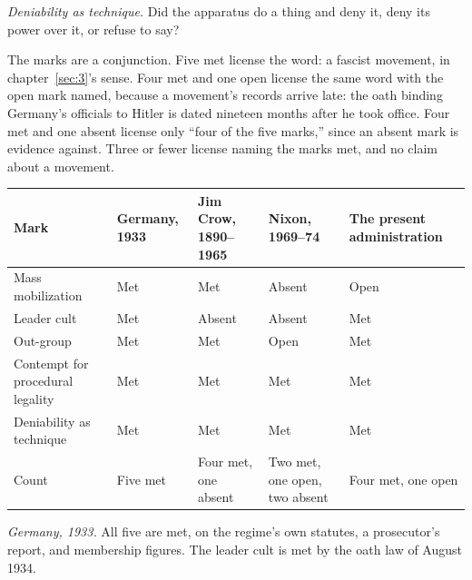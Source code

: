 \emph{Deniability as technique.} Did the apparatus do a thing and deny it, deny its power over it, or refuse to say?


The marks are a conjunction. Five met license the word: a fascist movement, in chapter~\ref{sec:3}'s sense. Four met and one open license the same word with the open mark named, because a movement's records arrive late: the oath binding Germany's officials to Hitler is dated nineteen months after he took office. Four met and one absent license only “four of the five marks,” since an absent mark is evidence against. Three or fewer license naming the marks met, and no claim about a movement.



\begingroup\small\renewcommand{\arraystretch}{1.12}
\begin{longtable}{@{}>{\raggedright\arraybackslash}p{}>{\raggedright\arraybackslash}p{}>{\raggedright\arraybackslash}p{}>{\raggedright\arraybackslash}p{}>{\raggedright\arraybackslash}p{}@{}}
\hline
\textbf{Mark} & \textbf{Germany, 1933} & \textbf{Jim Crow, 1890–1965} & \textbf{Nixon, 1969–74} & \textbf{The present administration} \\
\hline
\endhead
Mass mobilization & Met & Met & Absent & Open \\ \hline
Leader cult & Met & Absent & Absent & Met \\ \hline
Out-group & Met & Met & Open & Met \\ \hline
Contempt for procedural legality & Met & Met & Met & Met \\ \hline
Deniability as technique & Met & Met & Met & Met \\ \hline
Count & Five met & Four met, one absent & Two met, one open, two absent & Four met, one open \\ \hline
\end{longtable}
\endgroup

\emph{Germany, 1933.} All five are met, on the regime's own statutes, a prosecutor's report, and membership figures. The leader cult is met by the oath law of August 1934.

